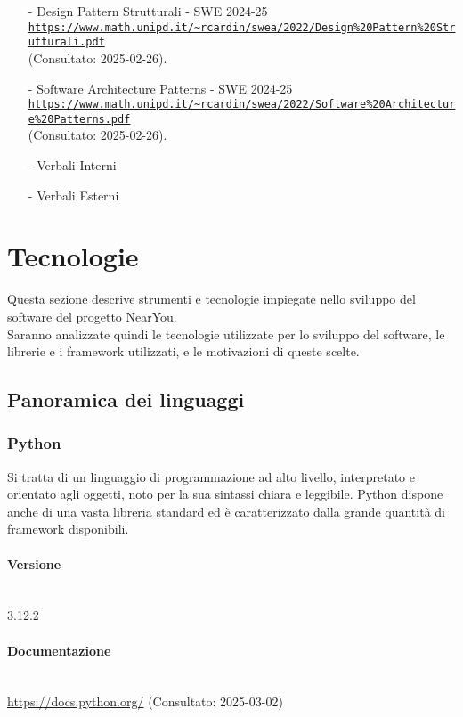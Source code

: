 \documentclass[10pt]{article}
\newcommand{\myparagraph}[1]{\paragraph{#1}\mbox{}\\\vspace{0.4em}}
\begin{document}
\begin{justify}
\begin{itemize}
    \item[-] Design Pattern Strutturali - SWE 2024-25\\
    \textcolor{blue}{\texttt{\url{https://www.math.unipd.it/\~rcardin/swea/2022/Design\%20Pattern\%20Strutturali.pdf}}}\\ (Consultato: 2025-02-26).
    
    \item[-] Software Architecture Patterns - SWE 2024-25\\
    \textcolor{blue}{\texttt{\url{https://www.math.unipd.it/\~rcardin/swea/2022/Software\%20Architecture\%20Patterns.pdf}}}\\ (Consultato: 2025-02-26).
    
    \item[-] Verbali Interni
    \item[-] Verbali Esterni
\end{itemize}

\section{Tecnologie}
Questa sezione descrive strumenti e tecnologie impiegate nello sviluppo del software del progetto NearYou.\\
Saranno analizzate quindi le tecnologie utilizzate per lo sviluppo del software, le librerie e i framework utilizzati, e le motivazioni di queste scelte.

\subsection{Panoramica dei linguaggi}
\label{sec:linguaggi}
    \subsubsection{Python}
        Si tratta di un linguaggio di programmazione ad alto livello, interpretato e orientato agli oggetti, noto per la sua sintassi chiara e leggibile. Python dispone
        anche di una vasta libreria standard ed è caratterizzato dalla grande quantità di framework disponibili.\\
        \myparagraph{Versione}
            3.12.2
        \myparagraph{Documentazione}
                 \textcolor{blue}{\url{https://docs.python.org/}} (Consultato: 2025-03-02)

\end{justify}
\end{document}
